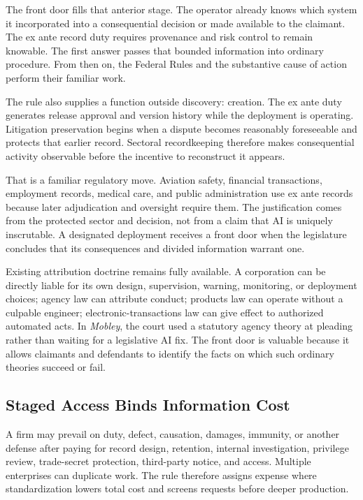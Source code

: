 The front door fills that anterior stage. The operator already knows which system it incorporated into a consequential decision or made available to the claimant. The ex ante record duty requires provenance and risk control to remain knowable. The first answer passes that bounded information into ordinary procedure. From then on, the Federal Rules and the substantive cause of action perform their familiar work.

The rule also supplies a function outside discovery: creation. The ex ante duty generates release approval and version history while the deployment is operating. Litigation preservation begins when a dispute becomes reasonably foreseeable and protects that earlier record. Sectoral recordkeeping therefore makes consequential activity observable before the incentive to reconstruct it appears.

That is a familiar regulatory move. Aviation safety, financial transactions, employment records, medical care, and public administration use ex ante records because later adjudication and oversight require them. The justification comes from the protected sector and decision, not from a claim that AI is uniquely inscrutable. A designated deployment receives a front door when the legislature concludes that its consequences and divided information warrant one.

Existing attribution doctrine remains fully available. A corporation can be directly liable for its own design, supervision, warning, monitoring, or deployment choices; agency law can attribute conduct; products law can operate without a culpable engineer; electronic-transactions law can give effect to authorized automated acts. In \emph{Mobley}, the court used a statutory agency theory at pleading rather than waiting for a legislative AI fix. The front door is valuable because it allows claimants and defendants to identify the facts on which such ordinary theories succeed or fail.

\subsection{Staged Access Binds Information Cost}

A firm may prevail on duty, defect, causation, damages, immunity, or another defense after paying for record design, retention, internal investigation, privilege review, trade-secret protection, third-party notice, and access. Multiple enterprises can duplicate work. The rule therefore assigns expense where standardization lowers total cost and screens requests before deeper production.

